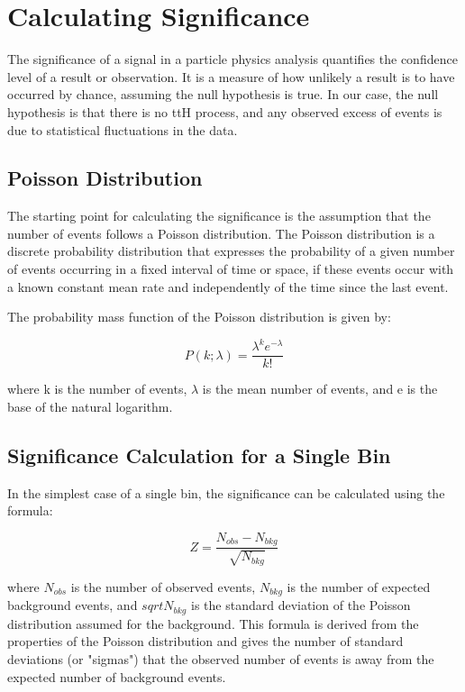\section{Calculating Significance}

The significance of a signal in a particle physics analysis quantifies the confidence level of a result or observation.
It is a measure of how unlikely a result is to have occurred by chance, assuming the null hypothesis is true. In our
case, the null hypothesis is that there is no ttH process, and any observed excess of events is due to statistical
fluctuations in the data.

\subsection{Poisson Distribution}

The starting point for calculating the significance is the assumption that the number of events follows a Poisson
distribution. The Poisson distribution is a discrete probability distribution that expresses the probability of a given
number of events occurring in a fixed interval of time or space, if these events occur with a known constant mean rate
and independently of the time since the last event.

The probability mass function of the Poisson distribution is given by:

\begin{equation}
    P(k; \lambda) = \frac{\lambda^k e^{-\lambda}}{k!}
\end{equation}

where k is the number of events, $\lambda$ is the mean number of events, and e is the base of the natural logarithm.

\subsection{Significance Calculation for a Single Bin}

In the simplest case of a single bin, the significance can be calculated using the formula:

\begin{equation}
    Z = \frac{N_{obs} - N_{bkg}}{\sqrt{N_{bkg}}}
\end{equation}

where $N_{obs}$ is the number of observed events, $N_{bkg}$ is the number of expected background events, and
$sqrt{N_{bkg}}$ is the standard deviation of the Poisson distribution assumed for the background. This formula is
derived from the properties of the Poisson distribution and gives the number of standard deviations (or "sigmas") that
the observed number of events is away from the expected number of background events.

